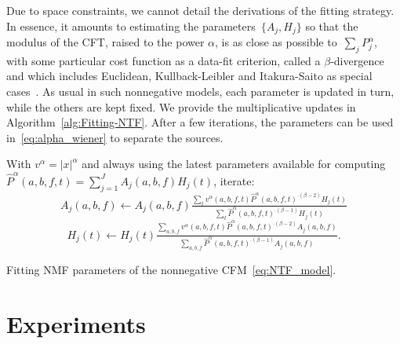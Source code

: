 Due to space constraints, we cannot detail the derivations of the
fitting strategy. In essence, it amounts to estimating the parameters~$\{ A_{j},H_{j}\} $
so that the modulus of the CFT, raised to the power $\alpha$, is
as close as possible to~$\sum_{j}P_{j}^{\alpha}$, with some particular
cost function as a data-fit criterion, called a $\beta$-divergence
and which includes Euclidean, Kullback-Leibler and Itakura-Saito as
special cases~\cite{NMF-betadivUR}. As usual in such nonnegative models,
each parameter is updated in turn, while the others are kept fixed.
We provide the multiplicative updates in Algorithm~\ref{alg:Fitting-NTF}.
After a few iterations, the parameters can be used in~\eqref{eq:alpha_wiener} to separate
the sources.

\begin{algorithm}
With $v^{\alpha}=\left|x\right|^{\alpha}$ and always using the latest
parameters available for computing
 $\hat{P}^{\alpha}\left(a,b,f,t\right)=\sum\limits_{j=1}^{J}A_{j}\left(a,b,f\right)H_{j}\left(t\right)$,
iterate:
\[
A_{j}\left(a,b,f\right)\leftarrow A_{j}\left(a,b,f\right)\tfrac{\sum_{t}v^{\alpha}\left(a,b,f,t\right)\hat{P}^{\alpha}\left(a,b,f,t\right)^{\cdot\left(\beta-2\right)}H_{j}\left(t\right)}{\sum_{t}\hat{P}^{\alpha}\left(a,b,f,t\right)^{\cdot\left(\beta-1\right)}H_{j}\left(t\right)}
\]
\[
H_{j}\left(t\right)\leftarrow H_{j}\left(t\right)\tfrac{\sum_{a,b,f}v^{\alpha}\left(a,b,f,t\right)\hat{P}^{\alpha}\left(a,b,f,t\right)^{\cdot\left(\beta-2\right)}A_{j}\left(a,b,f\right)}{\sum_{a,b,f}\hat{P}^{\alpha}\left(a,b,f,t\right)^{\cdot\left(\beta-1\right)}A_{j}\left(a,b,f\right)}.
\]


\caption{Fitting NMF parameters of the nonnegative CFM~\eqref{eq:NTF_model}.\label{alg:Fitting-NTF}}
\end{algorithm}

\section{Experiments}
\label{sec:experiment}


